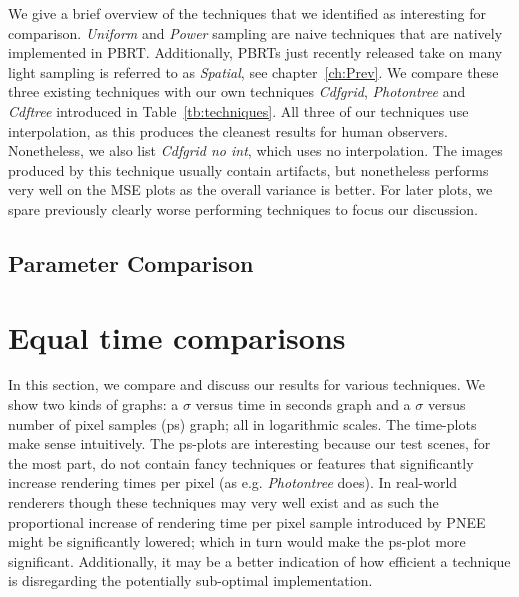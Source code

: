 We give a brief overview of the techniques that we identified as interesting for comparison. \textit{Uniform} and \textit{Power} sampling are naive techniques that are natively implemented in PBRT. Additionally, PBRTs just recently released take on many light sampling is referred to as \textit{Spatial}, see chapter~\ref{ch:Prev}. We compare these three existing techniques with our own techniques \textit{Cdfgrid}, \textit{Photontree} and \textit{Cdftree} introduced in Table~\ref{tb:techniques}. All three of our techniques use interpolation, as this produces the cleanest results for human observers. Nonetheless, we also list \textit{Cdfgrid no int}, which uses no interpolation. The images produced by this technique usually contain artifacts, but nonetheless performs very well on the MSE plots as the overall variance is better. For later plots, we spare previously clearly worse performing techniques to focus our discussion.

\subsection{Parameter Comparison}


\label{ch:ev:photontree}

\label{ch:ev:cdftree}


\label{ch:ev:photonsampling}


\label{ch:ev:uniformfloor}


\section{Equal time comparisons}
\label{sec:etc}
In this section, we compare and discuss our results for various techniques. We show two kinds of graphs: a $\sigma$ versus time in seconds graph and a $\sigma$ versus number of pixel samples (ps) graph; all in logarithmic scales. The time-plots make sense intuitively. The ps-plots are interesting because our test scenes, for the most part, do not contain fancy techniques or features that significantly increase rendering times per pixel (as e.g. \textit{Photontree} does). In real-world renderers though these techniques may very well exist and as such the proportional increase of rendering time per pixel sample introduced by PNEE might be significantly lowered; which in turn would make the ps-plot more significant. Additionally, it may be a better indication of how efficient a technique is disregarding the potentially sub-optimal implementation.

